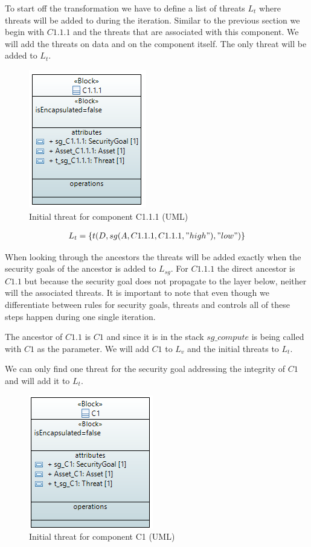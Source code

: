 To start off the transformation we have to define a list of threats $L_t$ where threats will be added to during the iteration. Similar to the previous section we begin with $C1.1.1$ and the threats that are associated with this component. We will add the threats on data and on the component itself. The only threat will be added to $L_t$.

\begin{figure}[H]
\centering
\includegraphics[scale=0.9]{pictures/block_c111_threat}
\caption{Initial threat for component C1.1.1 (UML)}
\end{figure}

\begin{align*}
L_t = \{t(D, sg(A,C1.1.1,C1.1.1,"high"), "low")\}
\end{align*}

When looking through the ancestors the threats will be added exactly when the security goals of the ancestor is added to $L_{sg}$. For $C1.1.1$ the direct ancestor is $C1.1$ but because the security goal does not propagate to the layer below, neither will the associated threats. It is important to note that even though we differentiate between rules for security goals, threats and controls all of these steps happen during one single iteration.

The ancestor of $C1.1$ is $C1$ and since it is in the stack $sg\_compute$ is being called with $C1$ as the parameter. We will add $C1$ to $L_v$ and the initial threats to $L_t$.

We can only find one threat for the security goal addressing the integrity of $C1$ and will add it to $L_t$.

\begin{figure}[H]
\centering
\includegraphics[scale=0.9]{pictures/block_c1_threat}
\caption{Initial threat for component C1 (UML)}
\end{figure}

